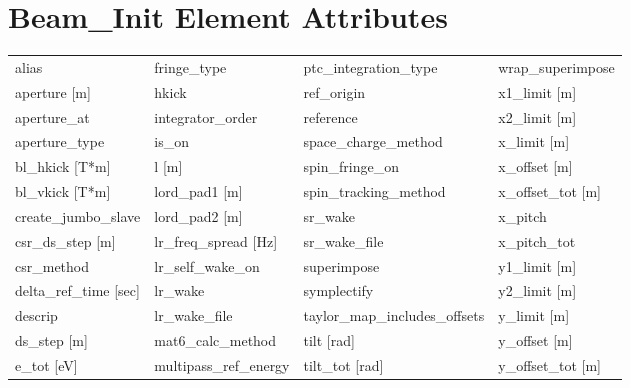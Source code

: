  \section{Beam_Init Element Attributes}
 \label{s:list.beam.init}
 
 \begin{tabular}{llll} \toprule
alias                            & fringe_type                      & ptc_integration_type             & wrap_superimpose                 \\
aperture [m]                     & hkick                            & ref_origin                       & x1_limit [m]                     \\
aperture_at                      & integrator_order                 & reference                        & x2_limit [m]                     \\
aperture_type                    & is_on                            & space_charge_method              & x_limit [m]                      \\
bl_hkick [T*m]                   & l [m]                            & spin_fringe_on                   & x_offset [m]                     \\
bl_vkick [T*m]                   & lord_pad1 [m]                    & spin_tracking_method             & x_offset_tot [m]                 \\
create_jumbo_slave               & lord_pad2 [m]                    & sr_wake                          & x_pitch                          \\
csr_ds_step [m]                  & lr_freq_spread [Hz]              & sr_wake_file                     & x_pitch_tot                      \\
csr_method                       & lr_self_wake_on                  & superimpose                      & y1_limit [m]                     \\
delta_ref_time [sec]             & lr_wake                          & symplectify                      & y2_limit [m]                     \\
descrip                          & lr_wake_file                     & taylor_map_includes_offsets      & y_limit [m]                      \\
ds_step [m]                      & mat6_calc_method                 & tilt [rad]                       & y_offset [m]                     \\
e_tot [eV]                       & multipass_ref_energy             & tilt_tot [rad]                   & y_offset_tot [m]                 \\

\end{tabular}
